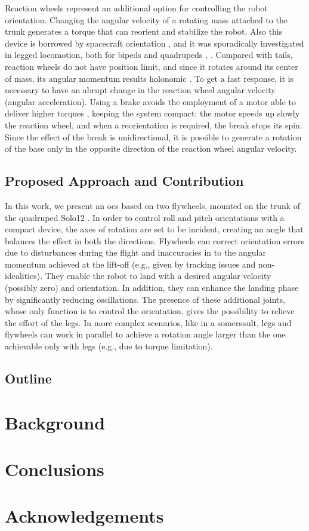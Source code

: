 \documentclass[journal,letterpaper]{IEEEtran}
\begin{document}
Reaction wheels represent an additional option for controlling the robot orientation.
Changing the angular velocity of a rotating mass attached to the trunk generates a torque that can reorient and stabilize the robot. Also this device is borrowed by spacecraft orientation \cite{oland2009reaction}, and it was sporadically investigated in legged locomotion, both for bipeds \cite{Brown2016}  \cite{xiong2020sequential} and quadrupeds \cite{kolvenbach2019towards}, \cite{vasilopoulos2016quadruped}.
Compared with tails, reaction wheels do not have position limit, and since it rotates around its center of mass, its angular momentum results holonomic \cite{machairas2015quadruped}.
To get a fast response, it is necessary to have an abrupt change in the reaction wheel angular velocity (angular acceleration).
Using a brake avoids the employment of a motor able to deliver higher torques \cite{gajamohan2012cubli}, keeping the system compact: the motor speeds up slowly the reaction wheel, and when a reorientation is required, the break stops its spin.
Since the effect of the break is unidirectional, it is possible to generate a rotation of the base only in the opposite direction of the reaction wheel angular velocity.

\subsection{Proposed Approach and Contribution}
In this work, we present an \acrlong{ocs} based on two flywheels, mounted on the trunk of the quadruped Solo12 \cite{grimminger2020open}. In order to control roll and pitch orientations with a compact device, the axes of rotation are set to be incident, creating an angle that balances the effect in both the directions. 
Flywheels can correct orientation errors due to disturbances during the flight and inaccuracies in to the angular momentum achieved at the lift-off (e.g., given by tracking issues and non-idealities). 
They enable the robot to land with a desired angular velocity (possibly zero) and orientation.
In addition, they can enhance the landing phase by significantly reducing oscillations.  
The presence of these additional joints, whose only function is to control the orientation, gives the possibility to relieve the effort of the legs.
In more complex scenarios, like in a somersault, legs and flywheels can work in parallel to achieve a rotation angle larger than the one achievable only with legs (e.g., due to torque limitation).

\subsection{Outline}
% 

\section{Background}


\section{Conclusions}
\label{sec:conclusion}

\small
\section*{Acknowledgements}	



\printbibliography
\end{document}
